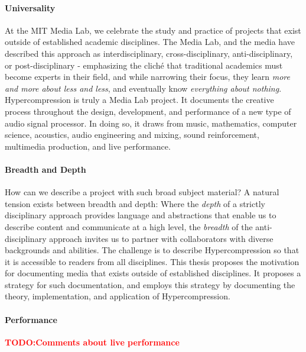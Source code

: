 \documentclass{tufte-book}
\newcommand{\TODO}[1]{\textcolor{red}{\bf TODO:#1}\xspace}
\newcommand{\thesis}{Hypercompression\xspace}
\begin{document}
\paragraph{Universality} At the MIT Media Lab, we celebrate the study
and practice of projects that exist outside of established academic
disciplines. The Media Lab, and the media have described this approach
as interdisciplinary, cross-disciplinary, anti-disciplinary, or
post-disciplinary - emphasizing the clich\'{e} that traditional
academics must become experts in their field, and while narrowing
their focus, they learn \textit{more and more about less and less},
and eventually know \textit{everything about nothing}.  \thesis is
truly a Media Lab project. It documents the creative process
throughout the design, development, and performance of a new type of
audio signal processor. In doing so, it draws from music, mathematics,
computer science, acoustics, audio engineering and mixing, sound
reinforcement, multimedia production, and live performance.

\paragraph{Breadth and Depth} How can we describe a project with such
broad subject material?  A natural tension exists between breadth and
depth: Where the \textit{depth} of a strictly disciplinary approach
provides language and abstractions that enable us to describe content
and communicate at a high level, the \textit{breadth} of the
anti-disciplinary approach invites us to partner with collaborators
with diverse backgrounds and abilities. The challenge is to describe
\thesis so that it is accessible to readers from all disciplines. This
thesis proposes the motivation for documenting media that exists
outside of established disciplines. It proposes a strategy for such
documentation, and employs this strategy by documenting the theory,
implementation, and application of \thesis.

\paragraph{Performance}
\TODO{Comments about live performance}
\end{document}
